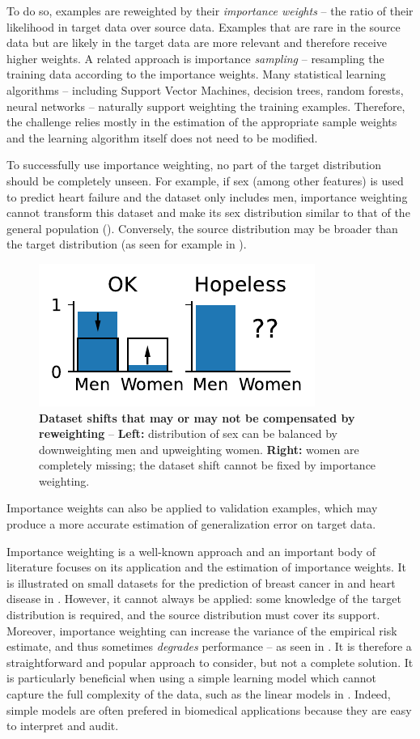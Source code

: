 \documentclass[twocolumn]{article}
\begin{document}
To do so, examples are reweighted by their \emph{importance weights} -- the
ratio of their likelihood in target data over source data. Examples that are 
rare in the source data but are likely in the target data are
more relevant and therefore receive higher weights.
A related approach is importance \emph{sampling} -- resampling the training data according to the importance weights.
%
Many statistical learning algorithms -- including Support Vector Machines,
decision trees, random forests, neural networks -- naturally
support weighting the training examples. Therefore, the challenge relies mostly
in the estimation of the appropriate sample weights and the learning algorithm
itself does not need to be modified.
%

%

To successfully use importance weighting, no part of the target distribution
should be completely unseen.
%
For example, if sex (among other features) is used to predict heart failure and
the dataset only includes men, importance weighting cannot transform this
dataset and make its sex distribution similar to that of the general population
().
%
Conversely, the source distribution may be broader than the target distribution
(as seen for example in ).
%
\begin{figure}[h]
\centering
\includegraphics[width=.2\textwidth]{importance_weighting_positivity.pdf}
\caption{\textbf{Dataset shifts that may or may not be compensated by
reweighting} -- \textbf{Left:} distribution of sex can be balanced by downweighting
    men and upweighting women. \textbf{Right:} women are completely missing; the
    dataset shift cannot be fixed by importance weighting.}
  \label{fig:importance-weighting-positivity}

\end{figure}

Importance weights can also be applied to validation examples, which may produce a more accurate estimation of generalization error on target data.


Importance weighting is a well-known approach and an important body of literature focuses on its application and the estimation of importance weights.
It is illustrated on small datasets for the prediction of breast cancer in \citet{dudik2006correcting} and heart disease in \citet{kouw2019review}.
However, it cannot always be applied: some knowledge of the target distribution is required, and the source distribution must cover its support.
Moreover, importance weighting can increase the variance of the empirical
risk estimate, and thus sometimes \emph{degrades} performance -- as seen in .
It is therefore a straightforward and popular approach to consider, but not a complete solution.
It is particularly beneficial when using a simple learning model which
cannot capture the full complexity of the data, such as the linear models
in . Indeed, simple models are often prefered in
biomedical applications because they are easy to interpret and audit.
\end{document}
